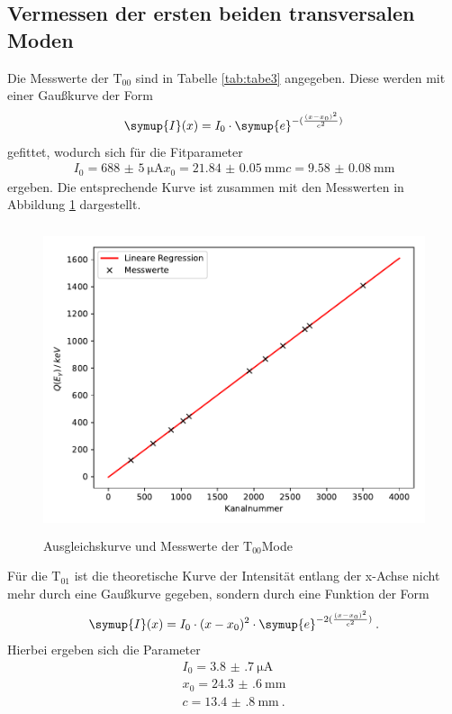 \subsection{Vermessen der ersten beiden transversalen Moden}
Die Messwerte der $\text{T}_{00}$ sind in Tabelle \ref{tab:tabe3} angegeben. Diese werden
mit einer Gaußkurve der Form
\begin{equation}
  \symup{I}(x) =I_0\cdot \symup{e}^{-(\frac{(x-x_0)^2}{c^2})}
  \label{eqn:gausk}
\end{equation}
gefittet, wodurch sich für die Fitparameter
\begin{align*}
  I_0 = \SI{688(5)}{\micro\ampere}
  x_0 = \SI{21.84(5)}{\milli\meter}
  c = \SI{9.58(8)}{\milli\meter}
\end{align*}
ergeben. Die entsprechende Kurve ist zusammen mit den Messwerten in Abbildung \ref{fig:plot3}
dargestellt.
\begin{figure}
  \centering
  \includegraphics[height=9cm]{Plot3.pdf}
  \caption{Ausgleichskurve und Messwerte der $\text{T}_{00}$Mode}
  \label{fig:plot3}
\end{figure}
Für die $\text{T}_{01}$ ist die theoretische Kurve der Intensität entlang der x-Achse nicht mehr
durch eine Gaußkurve gegeben, sondern durch eine Funktion der Form
\begin{equation}
  \symup{I}(x) =I_0\cdot(x-x_0)^2 \cdot \symup{e}^{-2(\frac{(x-x_0)^2}{c^2})} \: .
  \label{eqn:gausk}
\end{equation}
Hierbei ergeben sich die Parameter
\begin{align*}
  I_0 = \SI{3.8(7)}{\micro\ampere} \\
  x_0 = \SI{24.3(6)}{\milli\meter} \\
  c = \SI{13.4(8)}{\milli\meter} \: .
\end{align*}
